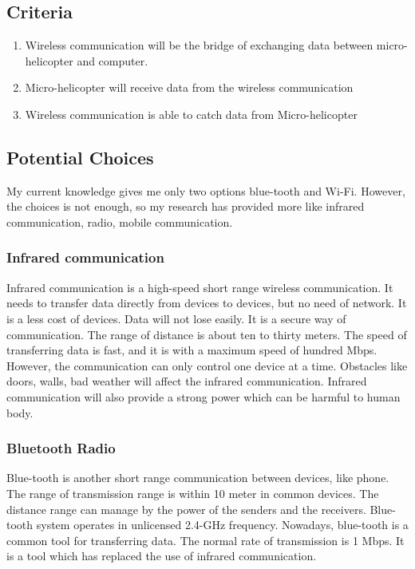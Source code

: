 \documentclass[letterpaper, 10, draftclsnofoot, onecolumn, compsoc]{IEEEtran}
\begin{document}
{\subsection{Criteria}
\begin{enumerate}
\item{Wireless communication will be the bridge of exchanging data between micro-helicopter and computer.}
\item{Micro-helicopter will receive data from the wireless communication}
\item{Wireless communication is able to catch data from Micro-helicopter}
\end{enumerate}

\subsection{Potential Choices}

My current knowledge gives me only two options blue-tooth and Wi-Fi.
However, the choices is not enough, so my research has provided more
like infrared communication, radio, mobile communication.

\subsubsection{Infrared communication}


Infrared communication is a high-speed short range wireless communication.\cite{r1}
It needs to transfer data directly from devices to devices, but no need of network.
It is a less cost of devices. Data will not lose easily.
It is a secure way of communication. The range of distance is about ten to thirty meters.
The speed of transferring data is fast, and it is with a maximum speed of hundred Mbps.
However, the communication can only control one device at a time.
Obstacles like doors, walls, bad weather will affect the infrared communication.
Infrared communication will also provide a strong power which can be harmful to human body.

\subsubsection{Bluetooth Radio}
Blue-tooth\cite{r2} is another short range communication between devices, like phone.
The range of transmission range is within 10 meter in common devices.
The distance range can manage by the power of the senders and the receivers.
Blue-tooth system operates in unlicensed 2.4-GHz frequency.
Nowadays, blue-tooth is a common tool for transferring data.
The normal rate of transmission is 1 Mbps.
It is a tool which has replaced the use of infrared communication.

}
\end{document}
